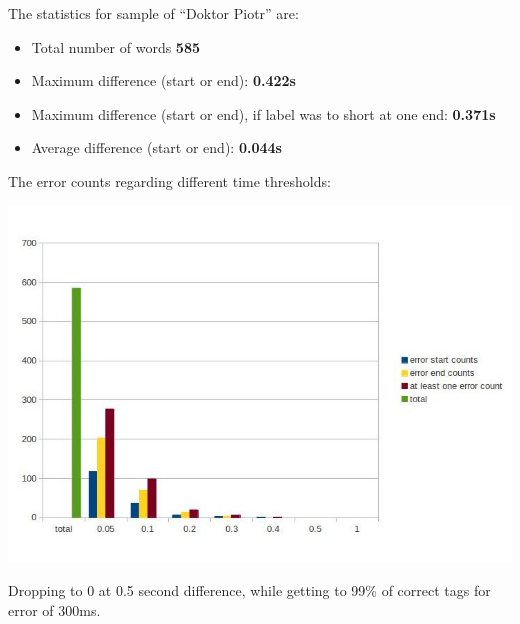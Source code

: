 \documentclass[12pt,a4paper,english]{article}
\begin{document}
The statistics for sample of “Doktor Piotr” are: \newline
\begin{itemize}
    \item Total number of words				\textbf{585}
    \item Maximum difference (start or end): 			\textbf{0.422s}
    \item Maximum difference (start or end), if label was to short at one end: 			\textbf{0.371s}
    \item Average difference  (start or end):			\textbf{0.044s}
\end{itemize}
The error counts regarding different time thresholds:
\begin{center}
    \includegraphics[scale=0.6]{doktor_piotr_length_based_counts.jpg}
\end{center}
Dropping to 0 at 0.5 second difference, while getting to 99\% of correct tags for error of 300ms.
\end{document}
